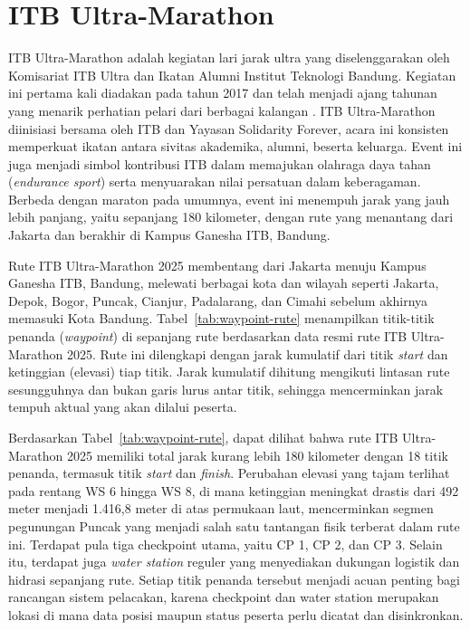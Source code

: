 \section{ITB Ultra-Marathon}
ITB Ultra-Marathon adalah kegiatan lari jarak ultra yang diselenggarakan oleh Komisariat ITB Ultra dan Ikatan Alumni Institut Teknologi Bandung. Kegiatan ini pertama kali diadakan pada tahun 2017 dan telah menjadi ajang tahunan yang menarik perhatian pelari dari berbagai kalangan \cite{Hafizh2025}. ITB Ultra-Marathon diinisiasi bersama oleh ITB dan Yayasan Solidarity Forever, acara ini konsisten memperkuat ikatan antara sivitas akademika, alumni, beserta keluarga. Event ini juga menjadi simbol kontribusi ITB dalam memajukan olahraga daya tahan (\textit{endurance sport}) serta menyuarakan nilai persatuan dalam keberagaman. Berbeda dengan maraton pada umumnya, event ini menempuh jarak yang jauh lebih panjang, yaitu sepanjang 180 kilometer, dengan rute yang menantang dari Jakarta dan berakhir di Kampus Ganesha ITB, Bandung.
 
Rute ITB Ultra-Marathon 2025 membentang dari Jakarta menuju Kampus Ganesha ITB, Bandung, melewati berbagai kota dan wilayah seperti Jakarta, Depok, Bogor, Puncak, Cianjur, Padalarang, dan Cimahi sebelum akhirnya memasuki Kota Bandung. Tabel~\ref{tab:waypoint-rute} menampilkan titik-titik penanda (\textit{waypoint}) di sepanjang rute berdasarkan data resmi rute ITB Ultra-Marathon 2025. Rute ini dilengkapi dengan jarak kumulatif dari titik \textit{start} dan ketinggian (elevasi) tiap titik. Jarak kumulatif dihitung mengikuti lintasan rute sesungguhnya dan bukan garis lurus antar titik, sehingga mencerminkan jarak tempuh aktual yang akan dilalui peserta.
 


Berdasarkan Tabel~\ref{tab:waypoint-rute}, dapat dilihat bahwa rute ITB Ultra-Marathon 2025 memiliki total jarak kurang lebih 180 kilometer dengan 18 titik penanda, termasuk titik \textit{start} dan \textit{finish}. Perubahan elevasi yang tajam terlihat pada rentang WS 6 hingga WS 8, di mana ketinggian meningkat drastis dari 492 meter menjadi 1.416,8 meter di atas permukaan laut, mencerminkan segmen pegunungan Puncak yang menjadi salah satu tantangan fisik terberat dalam rute ini. Terdapat pula tiga checkpoint utama, yaitu CP 1, CP 2, dan CP 3. Selain itu, terdapat juga \textit{water station} reguler yang menyediakan dukungan logistik dan hidrasi sepanjang rute. Setiap titik penanda tersebut menjadi acuan penting bagi rancangan sistem pelacakan, karena checkpoint dan water station merupakan lokasi di mana data posisi maupun status peserta perlu dicatat dan disinkronkan. 
 
